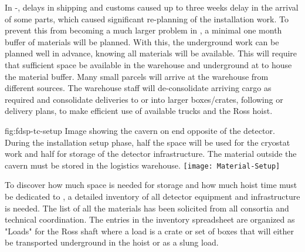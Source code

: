 In -, delays in shipping and customs caused up to three weeks delay in the arrival of some parts, which caused significant re-planning of the installation work. To prevent this from becoming a much larger problem in , a minimal one month buffer of materials will be planned. With this, the underground work can be planned well in advance, knowing all materials will be available. This will require that sufficient space be available in the warehouse and underground at  to house the material buffer. Many small parcels will arrive at the warehouse from different sources. The warehouse staff will de-consolidate arriving cargo as required and consolidate deliveries to  or  into larger boxes/crates, following  or  delivery plans, to make efficient use of available trucks and the Ross hoist. 


\begin{dunefigure}{fig:fdsp-tc-setup}
  {Image showing the cavern on end opposite of the detector. During the installation setup phase, half the space will be used for the cryostat work and half for storage of the detector infrastructure. The material outside the cavern must be stored in the logistics warehouse.}
\texttt{[image: Material-Setup]}
\end{dunefigure}
%

To discover how much space is needed for storage and how much hoist time must be dedicated to , a detailed inventory of all detector equipment and  infrastructure is needed. The list of all the materials has been solicited from all consortia and technical coordination. The entries in the inventory spreadsheet are organized as "Loads" for the Ross shaft where a load is a crate or set of boxes that will either be transported underground in the hoist or as a slung load.\cite{bib:docdb8426}

